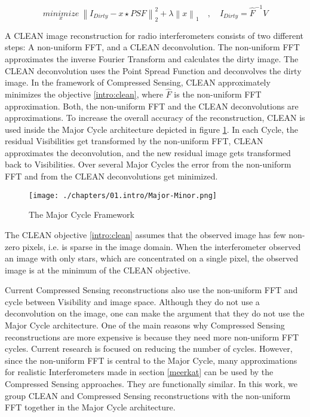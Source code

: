 \begin{equation}\label{intro:clean}
\underset{x}{minimize} \: \left \|  I_{Dirty} - x \star PSF \right \|_2^2 + \lambda \left \| x \right \|_1 \quad, \quad I_{Dirty} = \hat{F}^{-1} V
\end{equation}

A CLEAN image reconstruction for radio interferometers consists of two different steps: A non-uniform FFT, and a CLEAN deconvolution. The non-uniform FFT approximates the inverse Fourier Transform and calculates the dirty image. The CLEAN deconvolution uses the Point Spread Function and deconvolves the dirty image. In the framework of Compressed Sensing, CLEAN approximately minimizes the objective \eqref{intro:clean}, where $\hat{F}$ is the non-uniform FFT approximation. Both, the non-uniform FFT and the CLEAN deconvolutions are approximations. To increase the overall accuracy of the reconstruction, CLEAN is used inside the Major Cycle architecture depicted in figure \ref{intro:major}. In each Cycle, the residual Visibilities get transformed by the non-uniform FFT, CLEAN approximates the deconvolution, and the new residual image gets transformed back to Visibilities. Over several Major Cycles the error from the non-uniform FFT and from the CLEAN deconvolutions get minimized. 

\begin{figure}
	\centering
	\texttt{[image: ./chapters/01.intro/Major-Minor.png]}
	\caption{The Major Cycle Framework}
	\label{intro:major}
\end{figure}

The CLEAN objective \eqref{intro:clean} assumes that the observed image has few non-zero pixels, i.e. is sparse in the image domain. When the interferometer observed an image with only stars, which are concentrated on a single pixel, the observed image is at the minimum of the CLEAN objective. 

Current Compressed Sensing reconstructions also use the non-uniform FFT and cycle between Visibility and image space\cite{girard2015sparse,dabbech2018cygnus}. Although they do not use a deconvolution on the image, one can make the argument that they do not use the Major Cycle architecture. One of the main reasons why Compressed Sensing reconstructions are more expensive is because they need more non-uniform FFT cycles. Current research is focused on reducing the number of cycles\cite{dabbech2018cygnus}. However, since the non-uniform FFT is central to the Major Cycle, many approximations for realistic Interferometers made in section \ref{meerkat} can be used by the Compressed Sensing approaches. They are functionally similar. In this work, we group CLEAN and Compressed Sensing reconstructions with the non-uniform FFT together in the Major Cycle architecture.

 






